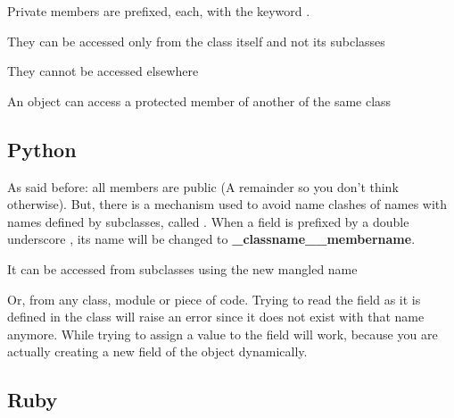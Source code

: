 \documentclass{KodeBook}
\begin{document}
Private members are prefixed, each, with the keyword .



They can be accessed only from the class itself and not its subclasses



They cannot be accessed elsewhere



An object can access a protected member of another of the same class



\subsection{Python}

As said before: all members are public (A remainder so you don't think otherwise).
But, there is a mechanism used to avoid name clashes of names with names defined by subclasses, called .
When a field is prefixed by a double underscore \keyword{\_\_}, its name will be changed to \textbf{\_classname\_\_membername}.



It can be accessed from subclasses using the new mangled name



Or, from any class, module or piece of code. 
Trying to read the field as it is defined in the class will raise an error since it does not exist with that name anymore.
While trying to assign a value to the field will work, because you are actually creating a new field of the object dynamically.



\subsection{Ruby}
\end{document}
